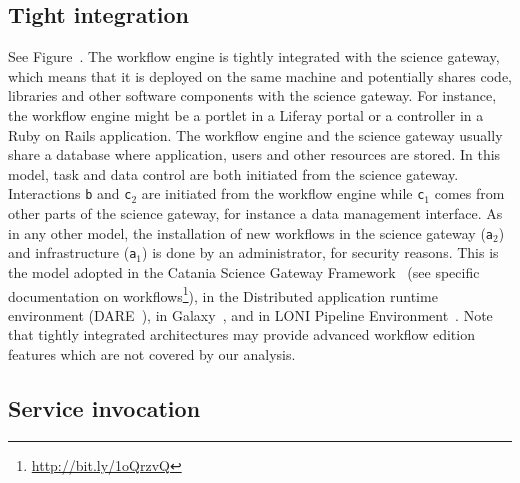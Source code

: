 \documentclass[preprint,3p,twocolumn]{elsarticle}
\newcommand{\note}[2]{\pdfmargincomment[color=yellow,author=#1,open=true]{#2}}
\newcommand{\closednote}[4]{} %
\begin{document}
\subsection{Tight integration}

See Figure~. The workflow engine is tightly
integrated with the science gateway, which means that it is deployed
on the same machine and potentially shares code, libraries and other
software components with the science gateway. For instance, the
workflow engine might be a portlet in a Liferay portal or a controller
in a Ruby on Rails application. The workflow engine and the science
gateway usually share a database where application, users and other
resources are stored\closednote{sorina}{VIP and Moteur also share the
  WorkflowsDB}{Tristan}{Yes, you are right. This is an example where
  such abstract architectures may not completely apply in real
  life. See comment about ``blended'' architectures in the
  discussion. In case of VIP, the sharing of the DB is more an
  implementation detail rather than a strong architectural pattern: we
  could avoid sharing the DB if we wanted.}.  In this model, task and
data control are both initiated from the science gateway. Interactions
\texttt{b} and \texttt{c$_2$} are initiated from the workflow engine
while \texttt{c$_1$} comes from other parts of the science gateway,
for instance a data management interface. As in any other model, the
installation of new workflows in the science gateway (\texttt{a$_2$})
and infrastructure (\texttt{a$_1$}) is done by an administrator, for
security reasons. This is the model adopted in the Catania Science
Gateway Framework~\cite{Ardizzone2012} (see specific documentation on
workflows\footnote{\url{http://bit.ly/1oQrzvQ}}), in the Distributed
application runtime environment
(DARE~\cite{maddineni2012distributed}), in
Galaxy~\cite{goecks2010galaxy}, and in LONI Pipeline
Environment~\cite{dinov2009efficient}. Note that tightly integrated
architectures may provide advanced workflow edition features which are
not covered by our analysis.

\subsection{Service invocation}
\end{document}
